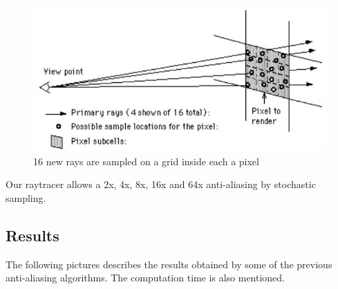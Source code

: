 \begin{figure}[H]
\centering
\includegraphics[width=0.5\linewidth]{img/antialiasing/stochastic.jpg}
\caption{16 new rays are sampled on a grid inside each a pixel}
\label{fig:aa_stochastic}
\end{figure}

Our raytracer allows a 2x, 4x, 8x, 16x and 64x anti-aliasing by stochastic sampling.


\subsection{Results}
The following pictures describes the results obtained by some of the previous anti-aliasing algorithms. The computation time is also mentioned.

